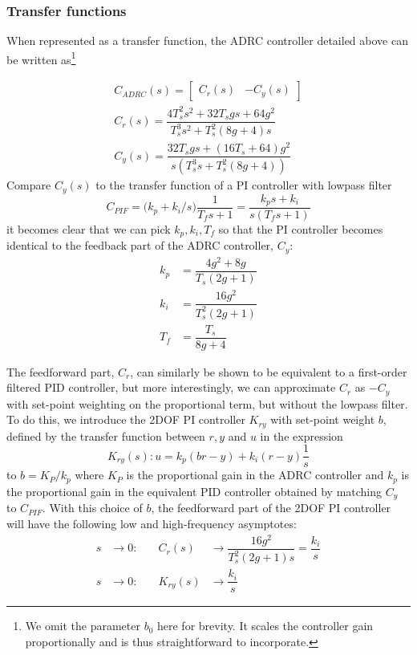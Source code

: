 \documentclass[letterpaper, 10 pt, conference]{ieeeconf}
\newcommand{\bmatrixx}[1]{\begin{bmatrix}#1\end{bmatrix}}
\begin{document}
\subsubsection{Transfer functions}

When represented as a transfer function, the ADRC controller detailed above can be written as\footnote{We omit the parameter $b_0$ here for brevity. It scales the controller gain proportionally and is thus straightforward to incorporate.}




\begin{align}
	C_{ADRC}(s) = \bmatrixx{C_r(s) & -C_y(s)}\\
	C_r(s) = \dfrac{4T_{s}^2s^2 + 32T_{s}gs + 64g^2}{T_{s}^3s^2 + T_{s}^2(8g + 4)s} \\
	C_y(s) = \dfrac{32T_{s}gs + (16T_{s} + 64)g^2}{s(T_{s}^3s + T_{s}^2(8g + 4))}
\end{align}
 Compare $C_y(s)$ to the transfer function of a PI controller with lowpass filter
$$C_{PIF} = \big(k_p + k_i/s \big)\dfrac{1}{T_f s + 1} = \dfrac{k_p s + k_i}{s(T_f s + 1)}$$
it becomes clear that we can pick $k_p, k_i, T_f$ so that the PI controller becomes identical to the feedback part of the ADRC controller, $C_y$:
\begin{align}
	k_p &= \dfrac{4 g^2 + 8 g}{T_s(2 g + 1)} \label{eq:kp}\\
	k_i &= \dfrac{16 g^2}{T_s^2(2g + 1)} \label{eq:ki}\\
	T_f &= \dfrac{T_s}{8 g + 4} \label{eq:Tf}
\end{align}



The feedforward part, $C_r$, can similarly be shown to be equivalent to a first-order filtered PID controller, but more interestingly, we can approximate $C_r$ as $-C_y$ with set-point weighting on the proportional term, but without the lowpass filter. To do this, we introduce the 2DOF PI controller $K_{ry}$ with set-point weight $b$, defined by the transfer function between $r,y$ and $u$ in the expression
$$K_{ry}(s) : u = k_p (br - y) + k_i(r-y)\frac{1}{s}$$
to $b = K_P / k_p$ where $K_P$ is the proportional gain in the ADRC controller and $k_p$ is the proportional gain in the equivalent PID controller obtained by matching $C_y$ to $C_{PIF}$. With this choice of $b$, the feedforward part of the 2DOF PI controller will have the following low and high-frequency asymptotes:
\begin{align}
	s &\to 0:  & \quad C_r(s) &\to \dfrac{16g^2}{T_{s}^2(2g + 1)s} = \dfrac{k_i}{s}  \\
	s &\to 0:  & \quad K_{ry}(s) &\to \dfrac{k_i}{s} 
\end{align}
\end{document}
